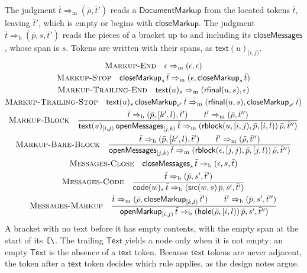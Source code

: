 \documentclass[11pt]{article}
\numberwithin{equation}{section}
\newcommand{\kw}[1]{\ensuremath{\mathsf{#1}}}
\newcommand{\str}[1]{\ensuremath{\text{\texttt{#1}}}}
\newcommand{\bs}{\textbackslash}
\newcommand{\Open}{\str{[\bs}}
\newcommand{\rulelabel}[1]{\textsc{#1}}
\begin{document}
The judgment $\bar t \Rightarrow_{\mathrm{m}} (\bar\rho, \bar t')$ reads a
$\kw{DocumentMarkup}$ from the located tokens $\bar t$, leaving $\bar t'$,
which is empty or begins with $\kw{closeMarkup}$.  The judgment
$\bar t \Rightarrow_{\mathrm{b}} (\bar p, s, \bar t')$ reads the pieces of a
bracket up to and including its $\kw{closeMessages}$, whose span is $s$.
Tokens are written with their spans, as $\kw{text}(u)_{[i,j)}$.
\begin{gather}
\label{eq:markup-end}
\rulelabel{Markup-End}\quad
\epsilon \Rightarrow_{\mathrm{m}} (\epsilon, \epsilon)
\\
\label{eq:markup-stop}
\rulelabel{Markup-Stop}\quad
\kw{closeMarkup}_{s}\,\bar t \Rightarrow_{\mathrm{m}}
  (\epsilon, \kw{closeMarkup}_{s}\,\bar t)
\\
\label{eq:markup-trailing-end}
\rulelabel{Markup-Trailing-End}\quad
\kw{text}(u)_{s} \Rightarrow_{\mathrm{m}} (\kw{rfinal}(u, s), \epsilon)
\\
\label{eq:markup-trailing-stop}
\rulelabel{Markup-Trailing-Stop}\quad
\kw{text}(u)_{s}\,\kw{closeMarkup}_{s'}\,\bar t \Rightarrow_{\mathrm{m}}
  (\kw{rfinal}(u, s), \kw{closeMarkup}_{s'}\,\bar t)
\\
\label{eq:markup-block}
\rulelabel{Markup-Block}\quad
\frac{\bar t \Rightarrow_{\mathrm{b}} (\bar p, [k', l), \bar t')
      \qquad \bar t' \Rightarrow_{\mathrm{m}} (\bar\rho, \bar t'')}
     {\kw{text}(u)_{[i,j)}\,\kw{openMessages}_{[j,k)}\,\bar t
      \Rightarrow_{\mathrm{m}}
      (\kw{rblock}(u, [i,j), \bar p, [i,l))\,\bar\rho, \bar t'')}
\\
\label{eq:markup-bare-block}
\rulelabel{Markup-Bare-Block}\quad
\frac{\bar t \Rightarrow_{\mathrm{b}} (\bar p, [k', l), \bar t')
      \qquad \bar t' \Rightarrow_{\mathrm{m}} (\bar\rho, \bar t'')}
     {\kw{openMessages}_{[j,k)}\,\bar t
      \Rightarrow_{\mathrm{m}}
      (\kw{rblock}(\epsilon, [j,j), \bar p, [j,l))\,\bar\rho, \bar t'')}
\\
\label{eq:messages-close}
\rulelabel{Messages-Close}\quad
\kw{closeMessages}_{s}\,\bar t \Rightarrow_{\mathrm{b}} (\epsilon, s, \bar t)
\\
\label{eq:messages-code}
\rulelabel{Messages-Code}\quad
\frac{\bar t \Rightarrow_{\mathrm{b}} (\bar p, s', \bar t')}
     {\kw{code}(w)_{s}\,\bar t \Rightarrow_{\mathrm{b}}
      (\kw{src}(w, s)\,\bar p, s', \bar t')}
\\
\label{eq:messages-markup}
\rulelabel{Messages-Markup}\quad
\frac{\bar t \Rightarrow_{\mathrm{m}}
        (\bar\rho, \kw{closeMarkup}_{[k,l)}\,\bar t')
      \qquad \bar t' \Rightarrow_{\mathrm{b}} (\bar p, s', \bar t'')}
     {\kw{openMarkup}_{[i,j)}\,\bar t \Rightarrow_{\mathrm{b}}
      (\kw{hole}(\bar\rho, [i,l))\,\bar p, s', \bar t'')}
\end{gather}
A bracket with no text before it has empty contents, with the empty span at
the start of its $\Open$.  The trailing $\kw{Text}$ yields a node only when
it is not empty: an empty $\kw{Text}$ is the absence of a $\kw{text}$
token.  Because $\kw{text}$ tokens are never adjacent, the token after a
$\kw{text}$ token decides which rule applies, as the design notes argue.
\end{document}
